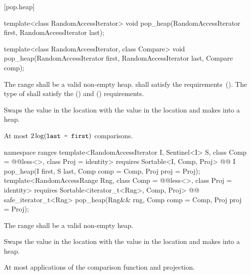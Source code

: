 [pop.heap]{}

%
\begin{itemdecl}
template<class RandomAccessIterator>
  void pop_heap(RandomAccessIterator first, RandomAccessIterator last);

template<class RandomAccessIterator, class Compare>
  void pop_heap(RandomAccessIterator first, RandomAccessIterator last,
                Compare comp);
\end{itemdecl}

\begin{itemdescr}
\pnum
\requires
The range
shall be a valid non-empty heap.
 shall satisfy the
 requirements~(). The type
of  shall satisfy the
 () and
 () requirements.

\pnum
\effects
Swaps the value in the location 
with the value in the location
and makes
into a heap.

\pnum
\complexity
At most
$2 \log(\texttt{last - first})$
comparisons.
\end{itemdescr}

\begin{addedblock}
%
\begin{itemdecl}
namespace ranges {
  template<RandomAccessIterator I, Sentinel<I> S, class Comp = @@less<>,
      class Proj = identity>
    requires Sortable<I, Comp, Proj>
    @@ I
      pop_heap(I first, S last, Comp comp = Comp{}, Proj proj = Proj{});
  template<RandomAccessRange Rng, class Comp = @@less<>, class Proj = identity>
    requires Sortable<iterator_t<Rng>, Comp, Proj>
    @@ safe_iterator_t<Rng>
      pop_heap(Rng&& rng, Comp comp = Comp{}, Proj proj = Proj{});
}
\end{itemdecl}

\begin{itemdescr}
\pnum
\requires
The range
shall be a valid non-empty heap.

\pnum
\effects
Swaps the value in the location 
with the value in the location
and makes
into a heap.

\pnum
\returns {}

\pnum
\complexity
At most
applications of the comparison function and projection.
\end{itemdescr}
\end{addedblock}

